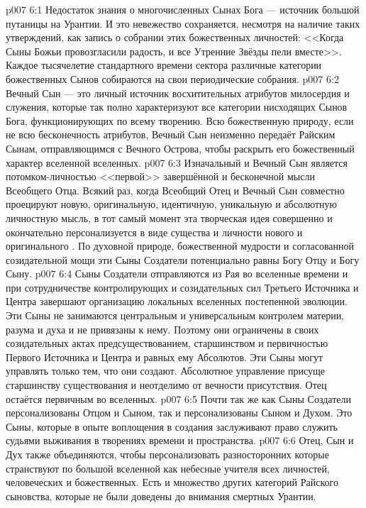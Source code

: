 \vs p007 6:1 Недостаток знания о многочисленных Сынах Бога --- источник большой путаницы на Урантии. И это невежество сохраняется, несмотря на наличие таких утверждений, как запись о собрании этих божественных личностей: <<Когда Сыны Божьи провозгласили радость, и все Утренние Звёзды пели вместе>>. Каждое тысячелетие стандартного времени сектора различные категории божественных Сынов собираются на свои периодические собрания.
\vs p007 6:2 Вечный Сын --- это личный источник восхитительных атрибутов милосердия и служения, которые так полно характеризуют все категории нисходящих Сынов Бога, функционирующих по всему творению. Всю божественную природу, если не всю бесконечность атрибутов, Вечный Сын неизменно передаёт Райским Сынам, отправляющимся с Вечного Острова, чтобы раскрыть его божественный характер вселенной вселенных.
\vs p007 6:3 \pc Изначальный и Вечный Сын является потомком\hyp{}личностью <<первой>> завершённой и бесконечной мысли Всеобщего Отца. Всякий раз, когда Всеобщий Отец и Вечный Сын совместно проецируют новую, оригинальную, идентичную, уникальную и абсолютную личностную мысль, в тот самый момент эта творческая идея совершенно и окончательно персонализуется в виде существа и личности нового и оригинального . По духовной природе, божественной мудрости и согласованной созидательной мощи эти Сыны Создатели потенциально равны Богу Отцу и Богу Сыну.
\vs p007 6:4 Сыны Создатели отправляются из Рая во вселенные времени и при сотрудничестве контролирующих и созидательных сил Третьего Источника и Центра завершают организацию локальных вселенных постепенной эволюции. Эти Сыны не занимаются центральным и универсальным контролем материи, разума и духа и не привязаны к нему. Поэтому они ограничены в своих созидательных актах предсуществованием, старшинством и первичностью Первого Источника и Центра и равных ему Абсолютов. Эти Сыны могут управлять только тем, что они создают. Абсолютное управление присуще старшинству существования и неотделимо от вечности присутствия. Отец остаётся первичным во вселенных.
\vs p007 6:5 \pc Почти так же как Сыны Создатели персонализованы Отцом и Сыном, так и  персонализованы Сыном и Духом. Это Сыны, которые в опыте воплощения в создания заслуживают право служить судьями выживания в творениях времени и пространства.
\vs p007 6:6 \pc Отец, Сын и Дух также объединяются, чтобы персонализовать разносторонних  которые странствуют по большой вселенной как небесные учителя всех личностей, человеческих и божественных. Есть и множество других категорий Райского сыновства, которые не были доведены до внимания смертных Урантии.
